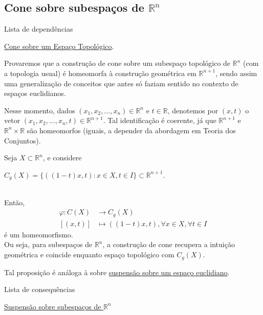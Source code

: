 \subsection{Cone sobre subespaços de $\mathbb{R}^n$}
\label{cone-euclidiano-prop}
\begin{titlemize}{Lista de dependências}
	\item \hyperref[cone-def]{Cone sobre um Espaço Topológico}.
\end{titlemize}
Provaremos que a construção de cone sobre um subespaço topológico de $\mathbb{R}^n$ (com a topologia usual) é homeomorfa à construção geométrica em $\mathbb{R}^{n+1}$, sendo assim uma generalização de conceitos que antes só faziam sentido no contexto de espaços euclidianos.

Nesse momento, dados $(x_1,x_2,...,x_n) \in \mathbb{R}^n$ e $t \in \mathbb{R}$, denotemos por $(x,t)$ o vetor $(x_1,x_2,...,x_n,t) \in \mathbb{R}^{n+1}$. Tal identificação é coerente, já que $\mathbb{R}^{n+1}$ e $\mathbb{R}^{n}\times\mathbb{R}$ são homeomorfos (iguais, a depender da abordagem em Teoria dos Conjuntos).

\begin{prop}
	Seja $X \subset \mathbb{R}^n$, e considere\\
    \centerline{$C_g(X) = \{((1-t)x,t):x\in X, t\in I\} \subset \mathbb{R}^{n+1}$.}\\
    Então,\begin{align*}
        \varphi: C(X) &\rightarrow C_g(X)\\
        [(x,t)] &\mapsto ((1-t)x,t), \forall x\in X, \forall t \in I
    \end{align*}
    é um homeomorfismo.\\
    Ou seja, para subespaços de $\mathbb{R}^n$, a construção de cone recupera a intuição geométrica e coincide enquanto espaço topológico com $C_g(X)$.
\end{prop}

Tal proposição é análoga à sobre \hyperref[suspensao-euclidiano-prop]{suspensão sobre um espaço euclidiano}.

\begin{titlemize}{Lista de consequências}
    \item \hyperref[suspensao-euclidiano-prop]{Suspensão sobre subespaços de $\mathbb{R}^n$}
\end{titlemize}